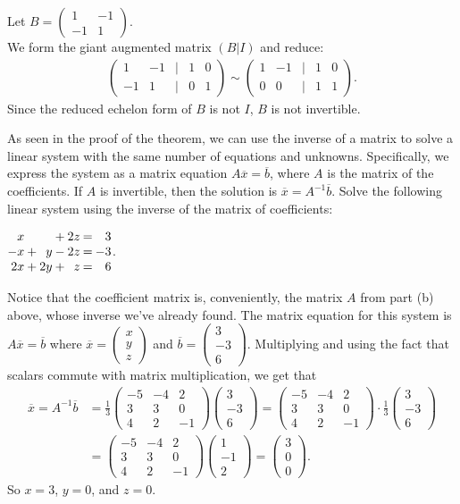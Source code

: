 \documentclass[12pt]{article}
\makeatletter
\def\it{\item}
\def\bc{\begin{center}} \def\ec{\end{center}}
\def\lp{\left(} \def\rp{\right)} \def\abs#1{\vert #1 \vert}
\def\bar#1{\overline{#1}}
\def\Frac#1#2{\displaystyle{\frac{#1}{#2}}}
\def\colth#1#2#3{\lp \begin{array}{rrr} #1 \\ #2 \\ #3 \end{array} \rp}
\newenvironment{linsys}[2][m]{%
\setlength{\arraycolsep}{.1111em} %
\begin{array}[#1]{@{}*{#2}{rc}r@{}} 
}{%
\end{array}}
\makeatother
\begin{document}
\it Let $B = \lp \begin{array}{rr} 1 & -1 \\ -1 & 1 \end{array} \rp$. \\
We form the giant augmented matrix $(B | I)$ and reduce:
\begin{align*}
\lp \begin{array}{rrcrr} 1 & -1 & | & 1 & 0 \\ 
               -1 & 1  & | & 0 & 1  \end{array} \rp \sim
\lp \begin{array}{rrcrr} 1 & -1 & | & 1 & 0 \\ 
                0 &  0 & | & 1 & 1 \end{array} \rp.
\end{align*}
Since the reduced echelon form of $B$ is not $I$, $B$ is not invertible.
\ee

\it As seen in the proof of the theorem, we can use the inverse of a matrix to solve a linear system with the same number of equations and unknowns.
	Specifically, we express the system as a matrix equation $A\bar{x} = \bar{b}$, where $A$ is the matrix of the coefficients. If $A$ is invertible, then the solution is $\bar{x} = A^{-1}\bar{b}$. Solve the following linear system using the inverse of the matrix of coefficients:
	\bc
	$\begin{linsys}{3}
	 x &  &\  &+ &2z  &= &3 \\
	-x &+ &y  &- &2z  &= &-3 \\
	2x &+ &2y &+ &z   &= &6
	\end{linsys}$.
	\ec
Notice that the coefficient matrix is, conveniently, the matrix $A$ from part (b) above, whose inverse we've already found. The matrix equation for this system is 
$A\bar{x} = \bar{b}$ where $\bar{x} = \colth{x}{y}{z}$ and $\bar{b} = \colth{3}{-3}{6}$. Multiplying and using the fact that scalars commute with matrix multiplication, we get that
\begin{align*}
\bar{x} = A^{-1}\bar{b} &= 
\Frac{1}{3} \lp \begin{array}{rrr} -5 & -4 & 2 \\ 3 & 3 & 0 \\ 4 & 2 & -1 \end{array} \rp \colth{3}{-3}{6} = 
\lp \begin{array}{rrr} -5 & -4 & 2 \\ 3 & 3 & 0 \\ 4 & 2 & -1 \end{array} \rp \cdot \Frac{1}{3} \colth{3}{-3}{6} \\[.05in]
&= \lp \begin{array}{rrr} -5 & -4 & 2 \\ 3 & 3 & 0 \\ 4 & 2 & -1 \end{array} \rp 
\colth{1}{-1}{2} = \colth{3}{0}{0}.
\end{align*}
So $x = 3$, $y = 0$, and $z = 0$.
\ee
\end{document}
